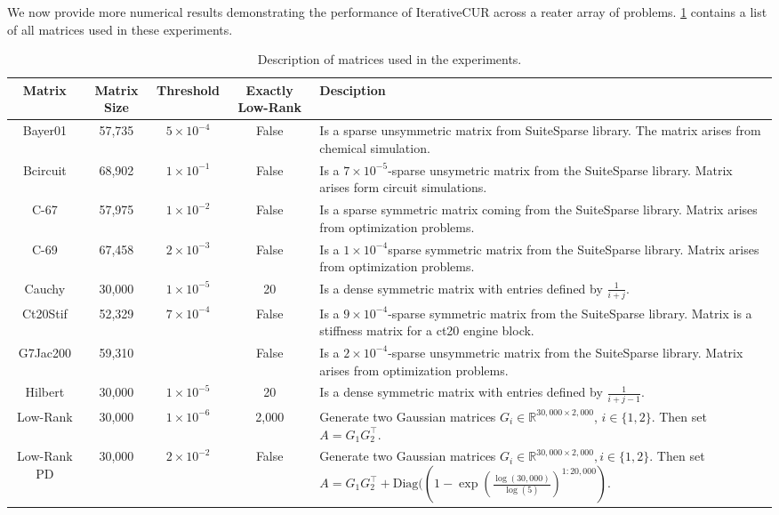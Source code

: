 We now provide more numerical results demonstrating the performance of IterativeCUR across a reater array of problems. \cref{tab:test-matrices} contains a list of all matrices used in these experiments.
\begin{center}
    \begin{longtable}{|c|c|c|c|p{.27\linewidth}|}
        \caption{Description of matrices used in the experiments.} \label{tab:test-matrices} \\
        \hline
        Matrix & Matrix Size & Threshold & Exactly Low-Rank & Desciption \\ \hline
        Bayer01 & 57,735 &$5\times10^{-4}$ &False & Is a sparse unsymmetric matrix from SuiteSparse library. The matrix arises from chemical simulation. \\  \hline
        Bcircuit & 68,902 &$1\times10^{-1}$ &False & Is a $7 \times 10^{-5}$-sparse unsymetric matrix from the SuiteSparse library. Matrix arises form circuit simulations.\\ \hline
         C-67 & 57,975 & $1\times10^{-2}$&False & Is a sparse symmetric matrix coming from the SuiteSparse library. Matrix arises from optimization problems.\\ \hline
        C-69 & 67,458 &$2\times10^{-3}$ &False & Is a $1 \times 10^{-4}$sparse symmetric matrix from the SuiteSparse library. Matrix arises from optimization problems.\\  \hline
        Cauchy & 30,000 & $1\times10^{-5}$& 20 &Is a dense symmetric matrix with entries defined by $\frac{1}{i+j}$.\\  \hline
        Ct20Stif & 52,329 &$7\times10^{-4}$ & False & Is a  $9 \times 10^{-4}$-sparse symmetric matrix from the SuiteSparse library. Matrix is a stiffness matrix for a ct20 engine block.\\  \hline
        G7Jac200 & 59,310 & & False & Is a $2 \times 10^{-4}$-sparse unsymmetric matrix from the SuiteSparse library. Matrix arises from optimization problems.\\   \hline
        Hilbert & 30,000 &$1\times10^{-5}$ &20 & Is a dense symmetric matrix with entries defined by $\frac{1}{i+j-1}$.\\  \hline
        Low-Rank & 30,000 &$1\times10^{-6}$ &2,000 &  Generate two Gaussian matrices $G_i \in \mathbb{R}^{30,000 \times 2,000}$, $i \in \{1,2\}$. Then set $A = G_1G_2^\top$.\\  \hline
         Low-Rank PD& 30,000 & $2\times10^{-2}$& False & Generate two Gaussian matrices $G_i \in \mathbb{R}^{30,000 \times 2,000}, i \in \{1,2\}$. Then set $A = G_1G_2^\top + \text{Diag}((1-\exp(\frac{\log(30,000)}{\log(5)})^{1:20,000})$.\\ \hline

\end{longtable}
\end{center}
